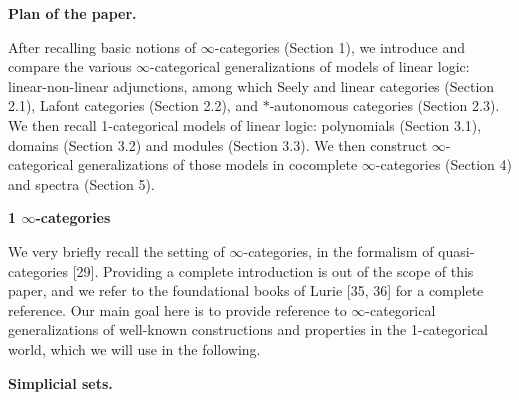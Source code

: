  
 
 
\par\medskip\noindent\textbf{Plan of the paper.}\par
 
 
After recalling basic notions of $\infty$-categories (Section 1), we introduce and compare the various $\infty$-categorical generalizations of models of linear logic: linear-non-linear adjunctions, among which Seely and linear categories (Section 2.1), Lafont categories (Section 2.2), and $*$-autonomous categories (Section 2.3). We then recall 1-categorical models of linear logic: polynomials (Section 3.1), domains (Section 3.2) and modules (Section 3.3). We then construct $\infty$-categorical generalizations of those models in cocomplete $\infty$-categories (Section 4) and spectra (Section 5).\par
 
 
 


 
\par\medskip\noindent\textbf{1 $\infty$-categories}\par
 
 
We very briefly recall the setting of $\infty$-categories, in the formalism of quasi-categories [29]. Providing a complete introduction is out of the scope of this paper, and we refer to the foundational books of Lurie [35, 36] for a complete reference. Our main goal here is to provide reference to $\infty$-categorical generalizations of well-known constructions and properties in the 1-categorical world, which we will use in the following.\par
 
 
 
\par\medskip\noindent\textbf{Simplicial sets.}\par
 
 
